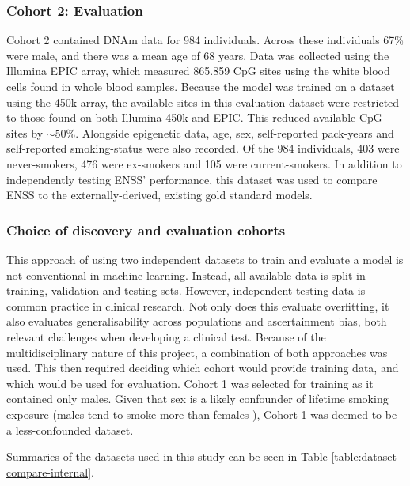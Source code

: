 \documentclass{article} %
\begin{document}
\subsubsection{Cohort 2: Evaluation}
Cohort 2 contained DNAm data for 984 individuals. Across these individuals 67\% were male, and there was a mean age of 68 years. Data was collected using the Illumina EPIC array, which measured \num{865,859} CpG sites using the white blood cells found in whole blood samples. Because the model was trained on a dataset using the 450k array, the available sites in this evaluation dataset were restricted to those found on both Illumina 450k and EPIC. This reduced available CpG sites by \(\sim\!50\%\). Alongside epigenetic data, age, sex, self-reported pack-years and self-reported smoking-status were also recorded. Of the 984 individuals, 403 were never-smokers, 476 were ex-smokers and 105 were current-smokers. In addition to independently testing ENSS' performance, this dataset was used to compare ENSS to the externally-derived, existing gold standard models.

\subsubsection{Choice of discovery and evaluation cohorts}
This approach of using two independent datasets to train and evaluate a model is not conventional in machine learning. Instead, all available data is split in training, validation and testing sets. However, independent testing data is common practice in clinical research. Not only does this evaluate overfitting, it also evaluates generalisability across populations and ascertainment bias, both relevant challenges when developing a clinical test. Because of the multidisciplinary nature of this project, a combination of both approaches was used. This then required deciding which cohort would provide training data, and which would be used for evaluation. Cohort 1 was selected for training as it contained only males. Given that sex is a likely confounder of lifetime smoking exposure (males tend to smoke more than females \cite{WHO2021Tobacco, higgins2015literature}), Cohort 1 was deemed to be a less-confounded dataset.

Summaries of the datasets used in this study can be seen in Table \ref{table:dataset-compare-internal}.

\end{document}
